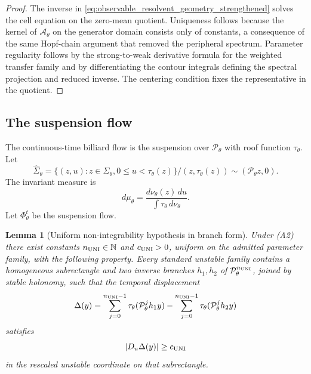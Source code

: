 \documentclass[12pt, letterpaper]{amsart}
\newcommand{\Acal}{\mathcal{A}}
\newcommand{\Pcal}{\mathcal{P}}
\theoremstyle{plain}
\newtheorem{lemma}[theorem]{Lemma}
\theoremstyle{definition}
\theoremstyle{remark}
\begin{document}
\begin{proof}
The inverse in \eqref{eq:observable_resolvent_geometry_strengthened} solves the
cell equation on the zero-mean quotient.  Uniqueness follows because the kernel
of $\Acal_\theta$ on the generator domain consists only of constants, a
consequence of the same Hopf-chain argument that removed the peripheral
spectrum.  Parameter regularity follows by the strong-to-weak derivative
formula for the weighted transfer family and by differentiating the contour
integrals defining the spectral projection and reduced inverse.  The centering
condition fixes the representative in the quotient.
\end{proof}


\subsection{The suspension flow}

The continuous-time billiard flow is the suspension over $\Pcal_\theta$ with roof function $\tau_\theta$.  Let
\begin{equation}
    \widehat\Sigma_\theta=\bigl\{(z,u):z\in\Sigma_\theta,
    0\le u<\tau_\theta(z)\bigr\}/(z,\tau_\theta(z))\sim(\Pcal_\theta z,0).
\end{equation}
The invariant measure is
\begin{equation}
    d\mu_\theta=\frac{d\nu_\theta(z)\,du}{\int\tau_\theta\,d\nu_\theta}.
\end{equation}
Let $\Phi_\theta^t$ be the suspension flow.



\begin{lemma}[Uniform non-integrability hypothesis in branch form]
\label{lem:uniform_nonintegrability_curvature}
Under \textup{(A2)} there exist constants
$n_{\rm UNI}\in\mathbb N$ and $c_{\rm UNI}>0$, uniform on the admitted
parameter family, with the following property.
Every standard unstable family contains a homogeneous subrectangle and two
inverse branches $h_1,h_2$ of $\Pcal_\theta^{n_{\rm UNI}}$, joined by stable
holonomy, such that the temporal displacement
\begin{equation}
    \Delta(y)=\sum_{j=0}^{n_{\rm UNI}-1}\tau_\theta(\Pcal_\theta^j h_1y)
             -\sum_{j=0}^{n_{\rm UNI}-1}\tau_\theta(\Pcal_\theta^j h_2y)
\end{equation}
satisfies
\begin{equation}
    |D_u\Delta(y)|\ge c_{\rm UNI}
\end{equation}
in the rescaled unstable coordinate on that subrectangle.
\end{lemma}
\end{document}
